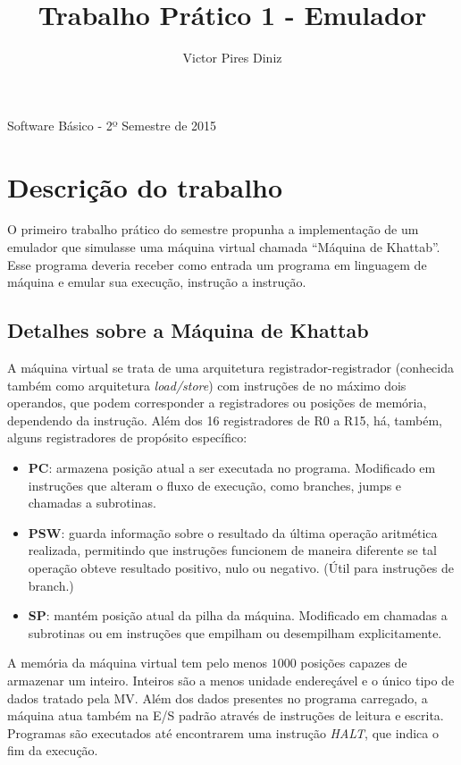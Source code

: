 \documentclass[10pt,a4paper]{article}
\title{Trabalho Prático 1 - Emulador}
\author{Victor Pires Diniz}
\numberwithin{equation}{section}
\begin{document}
\maketitle
\begin{center}
Software Básico - 2º Semestre de 2015
\end{center}

\section{Descrição do trabalho}

O primeiro trabalho prático do semestre propunha a implementação de um emulador que simulasse uma máquina virtual chamada ``Máquina de Khattab''. Esse programa deveria receber como entrada um programa em linguagem de máquina e emular sua execução, instrução a instrução.

\subsection{Detalhes sobre a Máquina de Khattab}

A máquina virtual se trata de uma arquitetura registrador-registrador (conhecida também como arquitetura \emph{load/store}) com instruções de no máximo dois operandos, que podem corresponder a registradores ou posições de memória, dependendo da instrução. Além dos 16 registradores de R0 a R15, há, também, alguns registradores de propósito específico:

\begin{itemize}
    \item \textbf{PC}: armazena posição atual a ser executada no programa. Modificado em instruções que alteram o fluxo de execução, como branches, jumps e chamadas a subrotinas.
    \item \textbf{PSW}: guarda informação sobre o resultado da última operação aritmética realizada, permitindo que instruções funcionem de maneira diferente se tal operação obteve resultado positivo, nulo ou negativo. (Útil para instruções de branch.)
    \item \textbf{SP}: mantém posição atual da pilha da máquina. Modificado em chamadas a subrotinas ou em instruções que empilham ou desempilham explicitamente.
\end{itemize}

A memória da máquina virtual tem pelo menos $1000$ posições capazes de armazenar um inteiro. Inteiros são a menos unidade endereçável e o único tipo de dados tratado pela MV. Além dos dados presentes no programa carregado, a máquina atua também na E/S padrão através de instruções de leitura e escrita. Programas são executados até encontrarem uma instrução \emph{HALT}, que indica o fim da execução.
\end{document}
